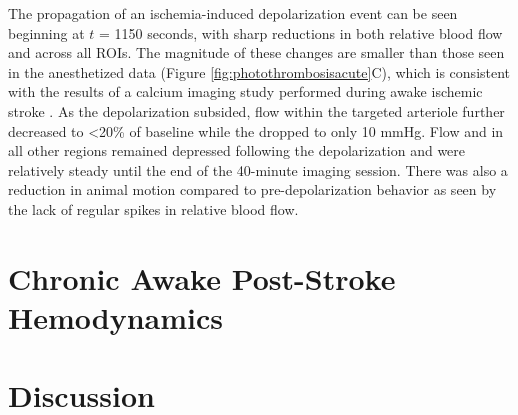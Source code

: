 The propagation of an ischemia-induced depolarization event can be seen beginning at $t$ = 1150 seconds, with sharp reductions in both relative blood flow and  across all ROIs. The magnitude of these changes are smaller than those seen in the anesthetized data (Figure \ref{fig:photothrombosisacute}C), which is consistent with the results of a calcium imaging study performed during awake ischemic stroke \cite{Balbi:2017cj}. As the depolarization subsided, flow within the targeted arteriole further decreased to \textless20\% of baseline while the  dropped to only 10 mmHg. Flow and  in all other regions remained depressed following the depolarization and were relatively steady until the end of the 40-minute imaging session. There was also a reduction in animal motion compared to pre-depolarization behavior as seen by the lack of regular spikes in relative blood flow.



\section{Chronic Awake Post-Stroke Hemodynamics}

\blindtext



\section{Discussion}

\blindtext



